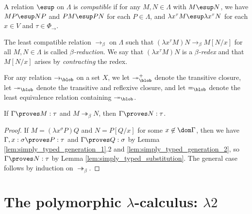 \documentclass[reqno]{amsart}
\begin{document}
    \begin{definition}
        A relation $\esup$ on $\Lambda$ is \textit{compatible} if for any $M,N\in\Lambda$ with $M\esup N$, we have $MP\esup NP$ and $PM\esup PN$ for each $P\in\Lambda$, and $\lambda x^\tau M\esup\lambda x^\tau N$ for each $x\in V$ and $\tau\in\Phi_\rightarrow$.
    \end{definition}

    \begin{definition}
        The least compatible relation $\rightarrow_\beta$ on $\Lambda$ such that $(\lambda x^\tau M)N\rightarrow_\beta M[N/x]$ for all $M,N\in\Lambda$ is called \textit{$\beta$-reduction}. We say that $(\lambda x^\tau M)N$ is a \textit{$\beta$-redex} and that $M[N/x]$ arises by \textit{contracting} the redex.
    \end{definition}

    \begin{notation}
        For any relation $\rightarrow_\blob$ on a set $X$, we let $\twoheadrightarrow_\blob^+$ denote the transitive closure, let $\twoheadrightarrow_\blob$ denote the transitive and reflexive closure, and let $=_\blob$ denote the least equivalence relation containing $\twoheadrightarrow_\blob$.
    \end{notation}

    \begin{theorem}
        If $\Gamma\proves M:\tau$ and $M\twoheadrightarrow_\beta N$, then $\Gamma\proves N:\tau$.
    \end{theorem}
    \begin{proof}
        If $M=(\lambda x^\sigma P)Q$ and $N=P[Q/x]$ for some $x\not\in\dom\Gamma$, then we have $\Gamma,x:\sigma\proves P:\tau$ and $\Gamma\proves Q:\sigma$ by Lemma \ref{lem:simply_typed_generation_1}.2 and \ref{lem:simply_typed_generation_2}, so $\Gamma\proves N:\tau$ by Lemma \ref{lem:simply_typed_substitution}. The general case follows by induction on $\twoheadrightarrow_\beta$.
    \end{proof}

    \section{The polymorphic $\lambda$-calculus: $\lambda2$}

    \begin{definition}
        
    \end{definition}
\end{document}
